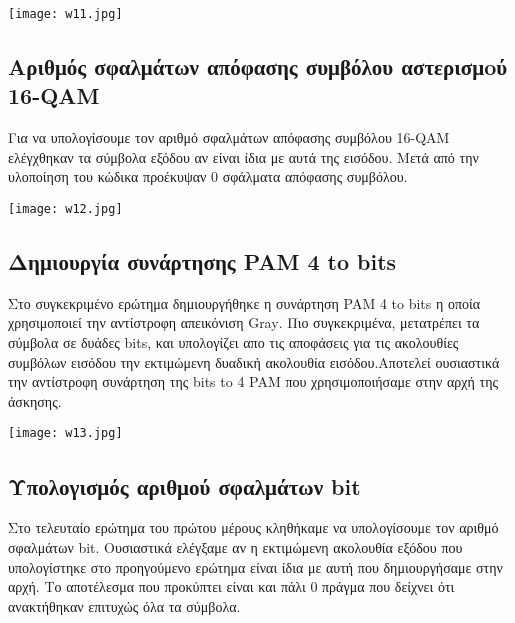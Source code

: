\documentclass[11pt]{article}
\newcommand{\np}{\newpage}	%
\begin{document}
\begin{center}
	\texttt{[image: w11.jpg]}
\end{center}

\subsection{Αριθμός σφαλμάτων απόφασης συμβόλου αστερισμoύ \foreignlanguage{english}{16-QAM}}
Για να υπολογίσουμε τον αριθμό σφαλμάτων απόφασης συμβόλου \foreignlanguage{english}{16-QAM} ελέγχθηκαν τα σύμβολα εξόδου αν είναι ίδια με αυτά της εισόδου. Μετά από την υλοποίηση του κώδικα προέκυψαν 0 σφάλματα απόφασης συμβόλου.

\begin{center}
	\texttt{[image: w12.jpg]}
\end{center}
\np
\subsection{Δημιουργία συνάρτησης \foreignlanguage{english}{PAM 4 to bits}}
Στο συγκεκριμένο ερώτημα δημιουργήθηκε η συνάρτηση  \foreignlanguage{english}{PAM 4 to bits} η οποία χρησιμοποιεί την αντίστροφη απεικόνιση \foreignlanguage{english}{Gray}. Πιο συγκεκριμένα, μετατρέπει τα σύμβολα σε δυάδες \foreignlanguage{english}{bits}, και υπολογίζει απο τις αποφάσεις για τις ακολουθίες συμβόλων εισόδου την εκτιμώμενη δυαδική ακολουθία εισόδου.Αποτελεί ουσιαστικά την αντίστροφη συνάρτηση της \foreignlanguage{english}{bits to 4 PAM} που χρησιμοποιήσαμε στην αρχή της άσκησης.

\begin{center}
	\texttt{[image: w13.jpg]}
\end{center}

\subsection{Υπολογισμός αριθμού σφαλμάτων \foreignlanguage{english}{bit}}
Στο τελευταίο ερώτημα του πρώτου μέρους κληθήκαμε να υπολογίσουμε τον αριθμό σφαλμάτων \foreignlanguage{english}{bit}. Ουσιαστικά ελέγξαμε αν η εκτιμώμενη ακολουθία εξόδου που υπολογίστηκε στο προηγούμενο ερώτημα είναι ίδια με αυτή που δημιουργήσαμε στην αρχή. Το αποτέλεσμα που προκύπτει είναι και πάλι 0 πράγμα που  δείχνει ότι ανακτήθηκαν επιτυχώς όλα τα σύμβολα.
\end{document}
